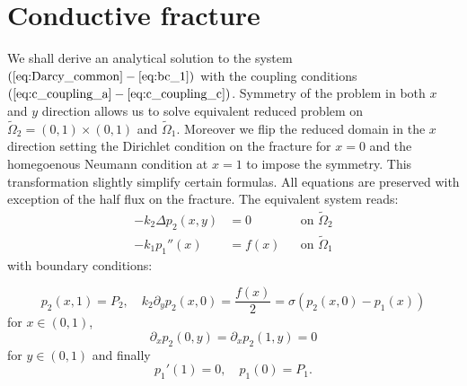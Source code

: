 \documentclass[a4paper,10pt]{article}
\def\Laplace{\Delta}
\def\prtl{\partial} %
\begin{document}
\section{Conductive fracture }
\label{sec:continuous_frac}
We shall derive an analytical solution to the system $(\ref{eq:Darcy_common} - \ref{eq:bc_1})$ with the coupling conditions 
$(\ref{eq:c_coupling_a} - \ref{eq:c_coupling_c})$. Symmetry of the problem in 
both $x$ and $y$ direction allows us to solve equivalent reduced problem on $\widetilde\Omega_2=(0,1)\times(0,1)$ and  
$\widetilde\Omega_1$. Moreover we flip the reduced domain in the $x$ direction setting the Dirichlet  condition on the fracture for $x=0$
and the homegoenous Neumann condition at $x=1$ to impose the symmetry. This transformation slightly simplify certain formulas.
All equations are preserved with exception of the half flux on the fracture. The equivalent system  reads:
\begin{align}
    \label{eq:cc_darcy_2d}
    -k_2 \Laplace p_2(x,y) &= 0         &&\text{on }\widetilde\Omega_2 \\
    \label{eq:cc_darcy_1d}
    -k_1 p_1''(x) &= f(x)               &&\text{on }\widetilde\Omega_1
\end{align}
with boundary conditions:    

\begin{equation}
    \label{eq:cc_bc_x}
    p_2(x, 1) = P_2, \quad
    k_2\prtl_y p_2(x,0) = \frac{f(x)}{2}
                        = \sigma(p_2(x,0) - p_1(x))
\end{equation}
for  $x\in (0,1)$,
\begin{equation}
    \label{eq:cc_bc_y}
    \prtl_x p_2(0,y) = \prtl_x p_2(1,y) = 0    
\end{equation}
for $y \in (0, 1)$ and finally
\begin{equation}
    \label{eq:cc_bc_1}
    p_1'(1) = 0, \quad  p_1(0) = P_1. 
\end{equation}
\end{document}

